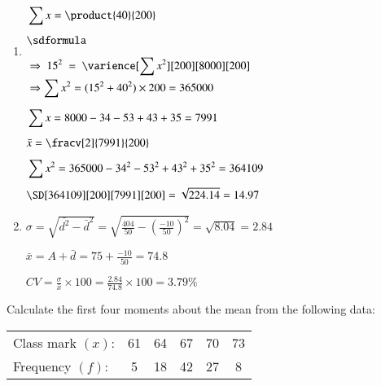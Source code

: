 \documentclass[12pt]{article}
\begin{document}
\vspace{1ex}
\begin{enumerate}[label=\textbf{(\alph*)}]
   \item \begin{minipage}[t]{0.46\linewidth}
   \noindent
   $\begin{aligned}
      &\sum{x} = \product{40}{200}\\[1ex]
      &\sdformula\\[1ex]
      &\Rightarrow \ 15^2 \ = \ \varience[\sum{x^2}][200][8000][200]\\
      &\Rightarrow \sum{x^2} = (15^2 + 40^2) \times 200 = 365000\\
   \end{aligned}$
\end{minipage}\vrule\hspace{1ex}
\begin{minipage}[t]{0.52\linewidth}
   \noindent
   $\begin{aligned}
      &\sum{x} = 8000-34-53+43+35 = 7991\\[1ex]
      &\bar{x} = \fracv[2]{7991}{200}\\[1ex]
      &\sum{x^2} = 365000-34^2-53^2+43^2+35^2 = 364109\\[1ex]
      &\SD[364109][200][7991][200] = \sqrt{224.14} = 14.97\\
   \end{aligned}$
\end{minipage}

\vspace{5ex}
\item $\sigma = \sqrt{\bar{d^2} - \bar{d}^2} = \sqrt{\frac{404}{50} - \left(\frac{-10}{50}\right)^2} = \sqrt{8.04} = 2.84$

\vspace{2ex}
$\bar{x} = A+\bar{d} = 75 + \frac{-10}{50} = 74.8$

\vspace{2ex}
$CV = \frac{\sigma}{\bar{x}} \times 100 = \frac{2.84}{74.8} \times 100 = 3.79\%$
\end{enumerate}


\pagebreak
\textbf{} Calculate the first four moments about the mean from the following data:

\vspace{-0.25\baselineskip}
\begin{center}
   \begin{tabularx}{0.8\linewidth}{lC|C|C|C|C|}
      Class mark $(x)$: & 61 & 64 & 67 & 70 & 73\\
      Frequency $(f)$: & 5 & 18 & 42 & 27 & 8\\
   \end{tabularx}
\end{center}
\end{document}
